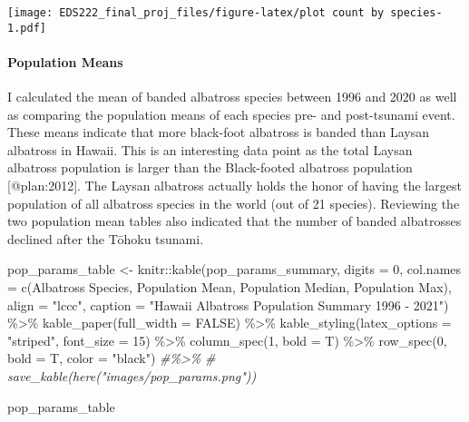 \documentclass[
]{article}
\newenvironment{Shaded}{\begin{snugshade}}{\end{snugshade}}
\newcommand{\AttributeTok}[1]{\textcolor[rgb]{0.77,0.63,0.00}{#1}}
\newcommand{\CommentTok}[1]{\textcolor[rgb]{0.56,0.35,0.01}{\textit{#1}}}
\newcommand{\ConstantTok}[1]{\textcolor[rgb]{0.00,0.00,0.00}{#1}}
\newcommand{\DecValTok}[1]{\textcolor[rgb]{0.00,0.00,0.81}{#1}}
\newcommand{\FunctionTok}[1]{\textcolor[rgb]{0.00,0.00,0.00}{#1}}
\newcommand{\NormalTok}[1]{#1}
\newcommand{\OtherTok}[1]{\textcolor[rgb]{0.56,0.35,0.01}{#1}}
\newcommand{\SpecialCharTok}[1]{\textcolor[rgb]{0.00,0.00,0.00}{#1}}
\newcommand{\StringTok}[1]{\textcolor[rgb]{0.31,0.60,0.02}{#1}}
\begin{document}
\texttt{[image: EDS222\_final\_proj\_files/figure-latex/plot count by species-1.pdf]}

\hypertarget{population-means}{%
\paragraph{Population Means}\label{population-means}}

I calculated the mean of banded albatross species between 1996 and 2020
as well as comparing the population means of each species pre- and
post-tsunami event. These means indicate that more black-foot albatross
is banded than Laysan albatross in Hawaii. This is an interesting data
point as the total Laysan albatross population is larger than the
Black-footed albatross population {[}@plan:2012{]}. The Laysan albatross
actually holds the honor of having the largest population of all
albatross species in the world (out of 21 species). Reviewing the two
population mean tables also indicated that the number of banded
albatrosses declined after the Tōhoku tsunami.

\begin{Shaded}
\begin{Highlighting}[]
\NormalTok{pop\_params\_table }\OtherTok{\textless{}{-}}\NormalTok{ knitr}\SpecialCharTok{::}\FunctionTok{kable}\NormalTok{(pop\_params\_summary,}
                                 \AttributeTok{digits =} \DecValTok{0}\NormalTok{,}
                                 \AttributeTok{col.names =} \FunctionTok{c}\NormalTok{(}\StringTok{\textquotesingle{}Albatross Species\textquotesingle{}}\NormalTok{, }\StringTok{\textquotesingle{}Population Mean\textquotesingle{}}\NormalTok{, }\StringTok{\textquotesingle{}Population Median\textquotesingle{}}\NormalTok{, }\StringTok{\textquotesingle{}Population Max\textquotesingle{}}\NormalTok{),}
                                 \AttributeTok{align =} \StringTok{"lccc"}\NormalTok{,}
                                 \AttributeTok{caption =} \StringTok{"Hawaii Albatross Population Summary 1996 {-} 2021"}\NormalTok{) }\SpecialCharTok{\%\textgreater{}\%}
  \FunctionTok{kable\_paper}\NormalTok{(}\AttributeTok{full\_width =} \ConstantTok{FALSE}\NormalTok{) }\SpecialCharTok{\%\textgreater{}\%}
  \FunctionTok{kable\_styling}\NormalTok{(}\AttributeTok{latex\_options =} \StringTok{"striped"}\NormalTok{,}
                \AttributeTok{font\_size =} \DecValTok{15}\NormalTok{) }\SpecialCharTok{\%\textgreater{}\%} 
  \FunctionTok{column\_spec}\NormalTok{(}\DecValTok{1}\NormalTok{, }\AttributeTok{bold =}\NormalTok{ T) }\SpecialCharTok{\%\textgreater{}\%}
  \FunctionTok{row\_spec}\NormalTok{(}\DecValTok{0}\NormalTok{, }\AttributeTok{bold =}\NormalTok{ T, }\AttributeTok{color =} \StringTok{"black"}\NormalTok{) }\CommentTok{\#\%\textgreater{}\% }
  \CommentTok{\# save\_kable(here("images/pop\_params.png"))}

\NormalTok{pop\_params\_table }
\end{Highlighting}
\end{Shaded}
\end{document}
